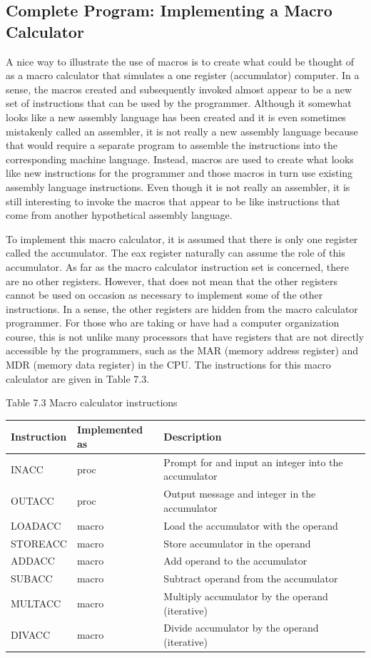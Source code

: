 \documentclass[10pt]{book}
\begin{document}
\subsection{Complete Program: Implementing a Macro Calculator}
A nice way to illustrate the use of macros is to create what could be thought of as a macro calculator that simulates a one register (accumulator) computer. In a sense, the macros created and subsequently invoked almost appear to be a new set of instructions that can be used by the programmer. Although it somewhat looks like a new assembly language has been created and it is even sometimes mistakenly called an assembler, it is not really a new assembly language because that would require a separate program to assemble the instructions into the corresponding machine language. Instead, macros are used to create what looks like new instructions for the programmer and those macros in turn use existing assembly language instructions. Even though it is not really an assembler, it is still interesting to invoke the macros that appear to be like instructions that come from another hypothetical assembly language.

To implement this macro calculator, it is assumed that there is only one register called the accumulator. The eax register naturally can assume the role of this accumulator. As far as the macro calculator instruction set is concerned, there are no other registers. However, that does not mean that the other registers cannot be used on occasion as necessary to implement some of the other instructions. In a sense, the other registers are hidden from the macro calculator programmer. For those who are taking or have had a computer organization course, this is not unlike many processors that have registers that are not directly accessible by the programmers, such as the MAR (memory address register) and MDR (memory data register) in the CPU. The instructions for this macro calculator are given in Table 7.3.

Table 7.3 Macro calculator instructions
\begin{center}
\begin{tabular}{|l|l|l|}
\hline
\textbf{Instruction} & \textbf{Implemented as} & \textbf{Description} \\
\hline
INACC & proc & Prompt for and input an integer into the accumulator \\
OUTACC & proc & Output message and integer in the accumulator \\
LOADACC & macro & Load the accumulator with the operand \\
STOREACC & macro & Store accumulator in the operand \\
ADDACC & macro & Add operand to the accumulator \\
SUBACC & macro & Subtract operand from the accumulator \\
MULTACC & macro & Multiply accumulator by the operand (iterative) \\
DIVACC & macro & Divide accumulator by the operand (iterative) \\
\hline
\end{tabular}
\end{center}
\end{document}
